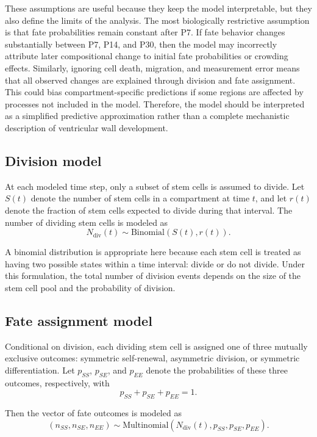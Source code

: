 \documentclass[12pt]{article}
\begin{document}
These assumptions are useful because they keep the model interpretable, but they also define the limits of the analysis. The most biologically restrictive assumption is that fate probabilities remain constant after P7. If fate behavior changes substantially between P7, P14, and P30, then the model may incorrectly attribute later compositional change to initial fate probabilities or crowding effects. Similarly, ignoring cell death, migration, and measurement error means that all observed changes are explained through division and fate assignment. This could bias compartment-specific predictions if some regions are affected by processes not included in the model. Therefore, the model should be interpreted as a simplified predictive approximation rather than a complete mechanistic description of ventricular wall development.

\subsection{Division model}

At each modeled time step, only a subset of stem cells is assumed to divide. Let $S(t)$ denote the number of stem cells in a compartment at time $t$, and let $r(t)$ denote the fraction of stem cells expected to divide during that interval. The number of dividing stem cells is modeled as
\[
N_{\mathrm{div}}(t) \sim \mathrm{Binomial}(S(t), r(t)).
\]

A binomial distribution is appropriate here because each stem cell is treated as having two possible states within a time interval: divide or do not divide. Under this formulation, the total number of division events depends on the size of the stem cell pool and the probability of division.

\subsection{Fate assignment model}

Conditional on division, each dividing stem cell is assigned one of three mutually exclusive outcomes: symmetric self-renewal, asymmetric division, or symmetric differentiation. Let $p_{SS}$, $p_{SE}$, and $p_{EE}$ denote the probabilities of these three outcomes, respectively, with
\[
p_{SS}+p_{SE}+p_{EE}=1.
\]

Then the vector of fate outcomes is modeled as
\[
(n_{SS}, n_{SE}, n_{EE}) \sim \mathrm{Multinomial}(N_{\mathrm{div}}(t), p_{SS}, p_{SE}, p_{EE}).
\]
\end{document}
